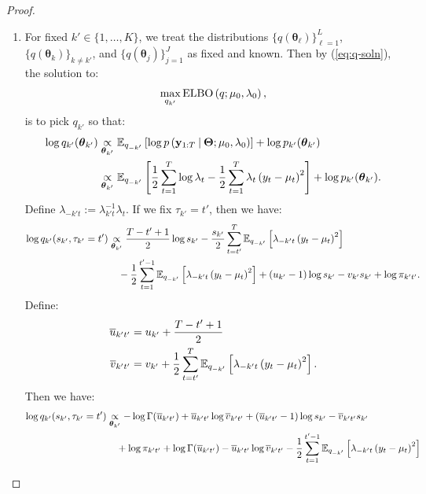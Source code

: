 \begin{proof}
\begin{enumerate}[label=\roman*.]
\item For fixed $k' \in\{1,\ldots,K\}$, we treat the distributions $\{q(\boldsymbol{\theta}_\ell)\}_{\ell=1}^L$, $\{q(\boldsymbol{\theta}_k)\}_{k \neq k'}$, and $\{q(\boldsymbol{\theta}_{j})\}_{j=1}^J$ as fixed and known. Then by (\ref{eq:q-soln}), the solution to:
\begin{align}
    \max_{q_{k'}} \text{\normalfont ELBO}\left(q;\mu_0,\lambda_0\right), \label{eq:elbo-k}
\end{align}
is to pick $q_{k'}$ so that:
\begin{align*}
    \log q_{k'}(\boldsymbol{\theta}_{k'}) &\underset{\boldsymbol{\theta}_{k'}}{\propto} \mathbb{E}_{q_{-k'}} \left[\log p\left(\mathbf{y}_{1:T} \:|\: \boldsymbol{\Theta};\mu_0,\lambda_0\right)\right] + \log p_{k'}(\boldsymbol{\theta}_{k'}) \\
    &\underset{\boldsymbol{\theta}_{k'}}{\propto}  \mathbb{E}_{q_{-k'}}\left[\frac{1}{2}\sum_{t=1}^{T} \log\lambda_t - \frac{1}{2}\sum_{t=1}^{T} \lambda_{t}\left(y_t - \mu_t\right)^2\right] + \log p_{k'}(\boldsymbol{\theta}_{k'}).
\end{align*}
Define $\lambda_{-k't} := \lambda_{k't}^{-1}\lambda_t$. If we fix $\tau_{k'} = t'$, then we have:
\begin{align*}
    \log q_{k'}(s_{k'},\tau_{k'} = t') &\underset{\boldsymbol{\theta}_{k'}}{\propto} \frac{T - t' + 1}{2} \log s_{k'} - \frac{s_{k'}}{2}\sum_{t=t'}^{T} \mathbb{E}_{q_{-k'}}\left[\lambda_{-k't}\left(y_t - \mu_t\right)^2\right] \\
    &\quad - \frac{1}{2}\sum_{t=1}^{t'-1} \mathbb{E}_{q_{-k'}}\left[\lambda_{-k't}\left(y_t - \mu_t\right)^2\right]  + (u_{k'}-1)\log s_{k'} - v_{k'} s_{k'} + \log \pi_{k't'}.
\end{align*}
Define:
\begin{align*}
    \overline{u}_{k't'} &= u_{k'} + \frac{T-t'+1}{2} \\
    \overline{v}_{k't'} &= v_{k'} + \frac{1}{2}\sum_{t=t'}^{T} \mathbb{E}_{q_{-k'}}\left[\lambda_{-k't}\left(y_t - \mu_t\right)^2\right].
\end{align*}
Then we have:
\begin{align*}
    \log q_{k'}(s_{k'},\tau_{k'} = t') 
    &\underset{\boldsymbol{\theta}_{k'}}{\propto} -  \log\Gamma(\overline{u}_{k't'}) + \overline{u}_{k't'} \log \overline{v}_{k't'} + \left(\overline{u}_{k't'} -1\right)\log s_{k'}  - \overline{v}_{k't'} s_{k'} \\
    &\quad + \log \pi_{k't'} + \log\Gamma(\overline{u}_{k't'}) - \overline{u}_{k't'} \log \overline{v}_{k't'} - \frac{1}{2}\sum_{t=1}^{t'-1} \E_{q_{-k'}}\left[\lambda_{-k't}\left(y_t - \mu_t\right)^2\right]

\end{align*}
\end{enumerate}
\end{proof}
